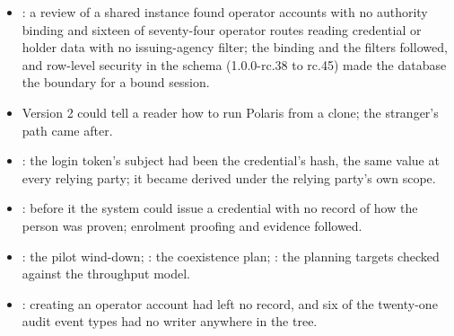 \begin{itemize}
  \item {}: a review of a shared instance found operator accounts with no authority binding
    and sixteen of seventy-four operator routes reading credential or holder data with no
    issuing-agency filter; the binding and the filters followed, and row-level security in the schema
    (1.0.0-rc.38 to rc.45) made the database the boundary for a bound session.
  \item Version 2 could tell a reader how to run Polaris from a clone; the stranger's path came after.
  \item {}: the login token's subject had been the credential's hash, the same value at every
    relying party; it became derived under the relying party's own scope.
  \item {}: before it the system could issue a credential with no record of how the person
    was proven; enrolment proofing and evidence followed.
  \item {}: the pilot wind-down; : the coexistence plan; : the
    planning targets checked against the throughput model.
  \item {}: creating an operator account had left no record, and six of the twenty-one audit
    event types had no writer anywhere in the tree.
\end{itemize}
